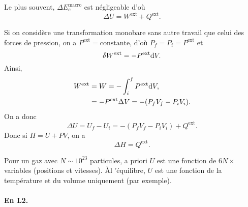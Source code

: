                 \begin{remark}
                    Le plus souvent, $\Delta E_c^{\text{macro}}$ est négligeable d'où
                    \begin{equation*}
                        \boxed{
                            \Delta U=W^{\text{ext}}+Q^{\text{ext}}.
                        }
                    \end{equation*}
                \end{remark}

                \begin{remark}
                    Si on considère une transformation monobare sans autre travail que celui des forces de pression, on a $P^{\text{ext}}=\mathrm{constante}$, d'où $P_f=P_i=P^{\text{ext}}$ et 
                    \begin{equation*}
                        \delta W^{\text{ext}}=-P^{\text{ext}}\mathrm{d} V.
                    \end{equation*}
                    Ainsi,
                    \begin{align*}
                        W^{\text{ext}}
                        &=
                        W=-\int_{i}^{f}P^{\text{ext}}\mathrm{d} V,\\
                        &=
                        -P^{\text{ext}}\Delta V=-(P_f V_f-P_i V_i).
                    \end{align*}
                    On a donc 
                    \begin{equation*}
                        \Delta U=U_f-U_i=-(P_f V_f-P_i V_i)+Q^{\text{ext}}.
                    \end{equation*}
                    Donc si $H=U+PV$, on a 
                    \begin{equation*}
                        \boxed{
                            \Delta H=Q^{\text{ext}}.
                        }
                    \end{equation*}
                \end{remark}

                \begin{example}
                    Pour un gaz avec $N\sim 10^{23}$ particules, a priori $U$ est une fonction de $6N\times $ variables (positions et vitesses). Àl 'équilibre, $U$ est une fonction de la température et du volume uniquement (par exemple).
                \end{example}

            \paragraph{En L2.}

